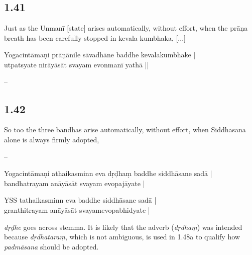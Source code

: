\begin{ekdosis}
\subsection*{1.41}
\begin{translation}[hp01_041]
Just as the Unmanī [state] arises automatically, without effort, when the prāṇa breath has been carefully stopped in kevala kumbhaka, [...]
\end{translation}

\begin{sources}[hp01_041]
\end{sources}

\begin{testimonia}[hp01_041]
Yogacintāmaṇi
\startverse
prāṇānile sāvadhāne baddhe kevalakumbhake |\\
utpatsyate nirāyāsāt svayam evonmanī yathā ||
\endverse
\end{testimonia}

\begin{philcomm}[hp01_041]
--
\end{philcomm}

\subsection*{1.42}
\begin{translation}[hp01_042]
So too the three bandhas arise automatically, without effort, when Siddhāsana alone is always firmly adopted,
\end{translation}

\begin{sources}[hp01_042]
--
\end{sources}

\begin{testimonia}[hp01_042]
Yogacintāmaṇi
\startverse
athaikasminn eva dṛḍhaṃ baddhe siddhāsane sadā |\\
bandhatrayam anāyāsāt svayam evopajāyate |
\endverse

YSS
\startverse
tathaikasminn eva baddhe siddhāsane sadā |\\
granthitrayam anāyāsāt svayamevopabhidyate |
\endverse
\end{testimonia}

\begin{philcomm}[hp01_042]
\emph{dṛḍhe} goes across stemma. It is likely that the adverb (\emph{dṛdhaṃ}) was intended because \emph{dṛdhataraṃ}, which is not ambiguous, is used in 1.48a to qualify how \emph{padmāsana} should be adopted.
\end{philcomm}


\end{ekdosis}
